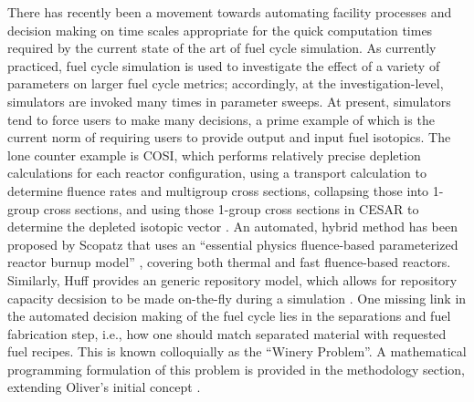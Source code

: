 There has recently been a movement towards automating facility processes and
decision making on time scales appropriate for the quick computation times
required by the current state of the art of fuel cycle simulation. As currently
practiced, fuel cycle simulation is used to investigate the effect of a variety
of parameters on larger fuel cycle metrics; accordingly, at the
investigation-level, simulators are invoked many times in parameter sweeps. At
present, simulators tend to force users to make many decisions, a prime example
of which is the current norm of requiring users to provide output and input fuel
isotopics. The lone counter example is COSI, which performs relatively precise
depletion calculations for each reactor configuration, using a transport
calculation to determine fluence rates and multigroup cross sections, collapsing
those into 1-group cross sections, and using those 1-group cross sections in
CESAR to determine the depleted isotopic vector \cite{meyer_new_2009}. An
automated, hybrid method has been proposed by Scopatz that uses an ``essential
physics fluence-based parameterized reactor burnup model''
\cite{scopatz_essential_2011}, covering both thermal and fast fluence-based
reactors.  Similarly, Huff provides an generic repository model, which allows
for repository capacity decsision to be made on-the-fly during a simulation
\cite{huff_integrated_2013}. One missing link in the automated decision making
of the fuel cycle lies in the separations and fuel fabrication step, i.e., how
one should match separated material with requested fuel recipes. This is known
colloquially as the ``Winery Problem''. A mathematical programming formulation
of this problem is provided in the methodology section, extending Oliver's
initial concept \cite{oliver_geniusv2:_2009}.

